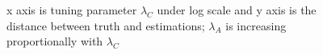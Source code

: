 \documentclass[fleqn]{article}
\begin{document}
\begin{figure}
\centering
{}
\caption{x axis is tuning parameter $\lambda_C$ under log scale and y axis is the distance between truth and estimations; $\lambda_A$ is increasing proportionally with $\lambda_C$}
\label{fig:low-high-d-sim}
\end{figure}
\end{document}

